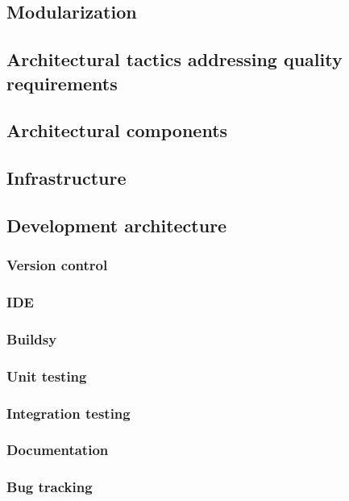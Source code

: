 \documentclass[a4paper,12pt,titlepage]{article}
\begin{document}
	\subsection{Modularization}
	\subsection{Architectural tactics addressing quality requirements}
	\subsection{Architectural components}
	\subsection{Infrastructure}
	\subsection{Development architecture}
					\subsubsection{Version control}	
					\subsubsection{IDE}	
					\subsubsection{Buildsy}
					\subsubsection{Unit testing}	
					\subsubsection{Integration testing}	
					\subsubsection{Documentation}
					\subsubsection{Bug tracking}	
\end{document}
